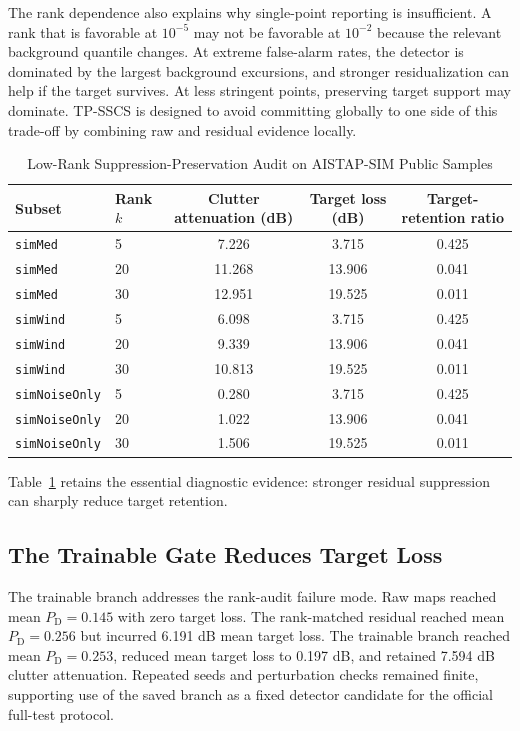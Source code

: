\documentclass[journal]{IEEEtran}
\begin{document}
The rank dependence also explains why single-point reporting is insufficient. A rank that is favorable at $10^{-5}$ may not be favorable at $10^{-2}$ because the relevant background quantile changes. At extreme false-alarm rates, the detector is dominated by the largest background excursions, and stronger residualization can help if the target survives. At less stringent points, preserving target support may dominate. TP-SSCS is designed to avoid committing globally to one side of this trade-off by combining raw and residual evidence locally.

\begin{table}[!t]
\caption{Low-Rank Suppression-Preservation Audit on AISTAP-SIM Public Samples}
\label{tab:lowrank-preservation-audit}
\centering
\scriptsize
\renewcommand{\arraystretch}{1.05}
\begin{tabular}{@{}llccc@{}}
\toprule
Subset & Rank $k$ & Clutter attenuation (dB) & Target loss (dB) & Target-retention ratio \\
\midrule
\texttt{simMed} & 5  & 7.226  & 3.715  & 0.425 \\
\texttt{simMed} & 20 & 11.268 & 13.906 & 0.041 \\
\texttt{simMed} & 30 & 12.951 & 19.525 & 0.011 \\
\texttt{simWind} & 5  & 6.098  & 3.715  & 0.425 \\
\texttt{simWind} & 20 & 9.339  & 13.906 & 0.041 \\
\texttt{simWind} & 30 & 10.813 & 19.525 & 0.011 \\
\texttt{simNoiseOnly} & 5  & 0.280 & 3.715  & 0.425 \\
\texttt{simNoiseOnly} & 20 & 1.022 & 13.906 & 0.041 \\
\texttt{simNoiseOnly} & 30 & 1.506 & 19.525 & 0.011 \\
\bottomrule
\end{tabular}
\vspace{0.15em}
\parbox{0.94\textwidth}{\scriptsize Table~\ref{tab:lowrank-preservation-audit} retains the essential diagnostic evidence: stronger residual suppression can sharply reduce target retention.}
\end{table}

\subsection{The Trainable Gate Reduces Target Loss}

The trainable branch addresses the rank-audit failure mode. Raw maps reached mean $P_{\mathrm{D}}=0.145$ with zero target loss. The rank-matched residual reached mean $P_{\mathrm{D}}=0.256$ but incurred 6.191 dB mean target loss. The trainable branch reached mean $P_{\mathrm{D}}=0.253$, reduced mean target loss to 0.197 dB, and retained 7.594 dB clutter attenuation. Repeated seeds and perturbation checks remained finite, supporting use of the saved branch as a fixed detector candidate for the official full-test protocol.
\end{document}

